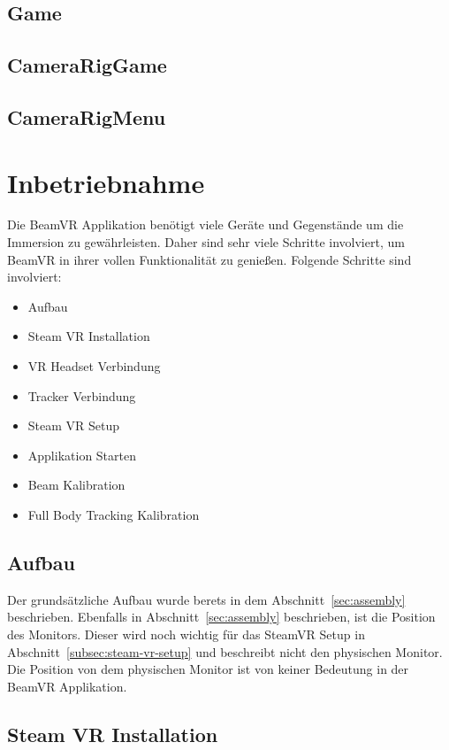 \subsection{Game}\label{subsec:game-prefab}
\subsection{CameraRigGame}\label{subsec:camera-rig-game-prefab}
\subsection{CameraRigMenu}\label{subsec:camera-rig-menu-prefab}
\section{Inbetriebnahme}\label{sec:commissioning}

Die BeamVR Applikation benötigt viele Geräte und Gegenstände um die Immersion zu gewährleisten.
Daher sind sehr viele Schritte involviert, um BeamVR in ihrer vollen Funktionalität zu genießen.
Folgende Schritte sind involviert:

\begin{itemize}
    \item Aufbau
    \item Steam VR Installation
    \item VR Headset Verbindung
    \item Tracker Verbindung
    \item Steam VR Setup
    \item Applikation Starten
    \item Beam Kalibration
    \item Full Body Tracking Kalibration
\end{itemize}


\subsection{Aufbau}

Der grundsätzliche Aufbau wurde berets in dem Abschnitt~\ref{sec:assembly} beschrieben.
Ebenfalls in Abschnitt~\ref{sec:assembly} beschrieben, ist die Position des Monitors.
Dieser wird noch wichtig für das SteamVR Setup in Abschnitt~\ref{subsec:steam-vr-setup} und beschreibt nicht den physischen Monitor.
Die Position von dem physischen Monitor ist von keiner Bedeutung in der BeamVR Applikation.

\subsection{Steam VR Installation}

